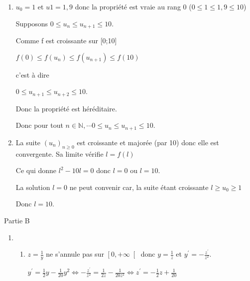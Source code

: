 \begin{corrige}
\begin{enumerate}
\begin{enumerate}[label=\alph*.]
\begin{center}
\end{center}
          \end{enumerate}
          \item
          $u_{0}=1$ et $u1=1,9$ donc la propriété est vraie au rang 0 ($0\leqslant 1\leqslant 1,9\leqslant 10$)
          \par
          Supposons $0\leqslant u_{n}\leqslant u_{n+1}\leqslant 10$.
          \par
          Comme f est  croissante sur [0;10]
          \par
          $f\left(0\right)\leqslant f\left(u_{n}\right)\leqslant f\left(u_{n+1}\right)\leqslant f\left(10\right)$
          \par
          c'est à dire
          \par
          $0\leqslant u_{n+1}\leqslant u_{n+2}\leqslant 10$.
          \par
          Donc la propriété est héréditaire.
          \par
          Donc pour tout $n \in \mathbb{N}, \cdots  0 \leqslant u_{n} \leqslant u_{n+1} \leqslant 10$.
          \item
          La suite $\left(u_{n}\right)_{n \geqslant 0}$ est croissante et majorée (par 10) donc elle est convergente. Sa limite vérifie $l=f\left(l\right)$
          \par
          Ce qui donne $l^{2}-10l=0$ donc $l=0$ ou $l=10$.
          \par
          La solution $l=0$ ne peut convenir car, la suite étant croissante $l\geqslant u_{0}\geqslant 1$
          \par
          Donc $l=10$.
     \end{enumerate}
     \begin{h3}Partie B\end{h3}
     \begin{enumerate}
          \item
          \begin{enumerate}[label=\alph*.]
               \item
               $z=\frac{1}{y}$ ne s'annule pas sur $\left[0,+\infty \right[$ donc $y=\frac{1}{z}$ et $y^{\prime}=-\frac{z^{\prime}}{z^{2}}$.
               \par
               $y^{\prime}=\frac{1}{2}y-\frac{1}{20}y^{2} \Leftrightarrow -\frac{z^{\prime}}{z^{2}}=\frac{1}{2z}-\frac{1}{20z^{2}} \Leftrightarrow  z^{\prime}=-\frac{1}{2}z+\frac{1}{20}$

\end{enumerate}
\end{enumerate}
\end{corrige}
